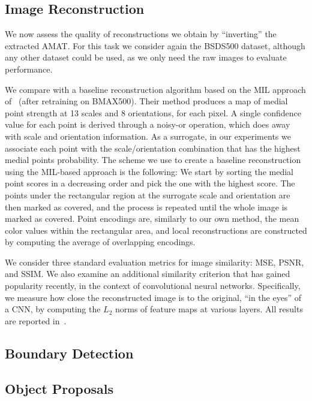 \documentclass[10pt,twocolumn,letterpaper]{article}
\begin{document}
\subsection{Image Reconstruction}\label{sec:experiments:reconstruction}
We now assess the quality of reconstructions we obtain by ``inverting'' the extracted AMAT.
For this task we consider again the BSDS500 dataset, although any other dataset could be used, 
as we only need the raw images to evaluate performance.

We compare with a baseline reconstruction algorithm based on the MIL approach 
of~\cite{tsogkas2012learning} (after retraining on BMAX500).
Their method produces a map of medial point strength at 13 scales and 8 orientations, for each pixel.
A single confidence value for each point is derived through a noisy-or operation,
which does away with scale and orientation information.
As a surrogate, in our experiments we associate each point with the scale/orientation combination
that has the highest medial points probability.
The scheme we use to create a baseline reconstruction using the MIL-based approach is the following:
We start by sorting the medial point scores in a decreasing order and pick the one with the highest score.
The points under the rectangular region at the surrogate scale and orientation are then marked as covered,
and the process is repeated until the whole image is marked as covered.
Point encodings are, similarly to our own method, the mean color values within the rectangular area, 
and local reconstructions are constructed by computing the average of overlapping encodings.

We consider three standard evaluation metrics for image similarity: MSE, PSNR, and SSIM.
We also examine an additional similarity criterion that has gained popularity recently, 
in the context of convolutional neural networks.
Specifically, we measure how close the reconstructed image is to the original,
``in the eyes'' of a CNN, by computing the $L_2$ norms of feature maps at various layers. 
All results are reported in~.


\subsection{Boundary Detection}\label{sec:experiments:edges}


\subsection{Object Proposals}\label{sec:experiments:proposals}
\end{document}
